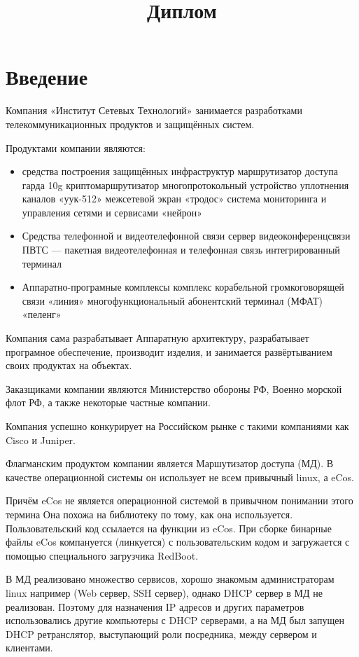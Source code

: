 \documentclass[12pt]{article}
\title{Диплом}
\begin{document}
\maketitle
\pagebreak
\section{Введение}

Компания «Институт Сетевых Технологий» занимается разработками телекоммуникационных продуктов и защищённых систем.

Продуктами компании являются:
\begin{itemize}
    \item средства построения защищённых инфраструктур
    \subitem маршрутизатор доступа гарда 10g
    \subitem криптомаршрутизатор многопротокольный
    \subitem устройство уплотнения каналов «уук-512»
    \subitem межсетевой экран «тродос»
    \subitem система мониторинга и управления сетями и сервисами «нейрон»
    \item Средства телефонной и видеотелефонной связи
    \subitem сервер видеоконференцсвязи
    \subitem ПВТС — пакетная видеотелефонная и телефонная связь
    \subitem интегрированный терминал
    \item Аппаратно-програмные комплексы
    \subitem комплекс корабельной громкоговорящей связи «линия»
    \subitem многофункциональный абонентский терминал (МФАТ) «пеленг»
\end{itemize}

Компания сама разрабатывает Аппаратную архитектуру, разрабатывает програмное обеспечение, производит изделия, и занимается развёртыванием своих продуктах на объектах.

Заказщиками компании являются Министерство обороны РФ, Военно морской флот РФ, а также некоторые частные компании.

Компания успешно конкурирует на Российском рынке с такими компаниями как Cisco и Juniper.

Флагманским продуктом компании является Маршутизатор доступа (МД). В качестве операционной системы он использует не всем привычный linux, а eCos.

Причём eCos не является операционной системой в привычном понимании этого термина
Она похожа на библиотеку по тому, как она используется.
Пользовательский код ссылается на функции из eCos.
При сборке бинарные файлы eCos компануется (линкуется) с пользовательским кодом и загружается с помощью специального загрузчика RedBoot.

В МД реализовано множество сервисов, хорошо знакомым администраторам linux например (Web сервер, SSH сервер), однако DHCP сервер в МД не реализован. Поэтому для назначения IP адресов и других параметров использовались другие компьютеры с DHCP серверами, а на МД был запущен DHCP ретранслятор, выступающий роли посредника, между сервером и клиентами.
\end{document}
